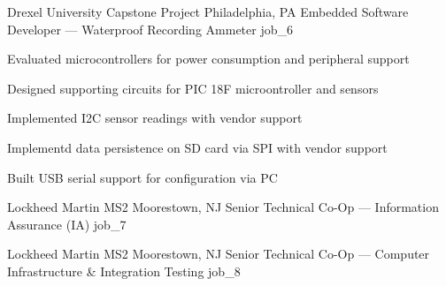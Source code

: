 \documentclass[10pt]{barag_resume}
\begin{document}
    \begin{job}{Drexel University Capstone Project}
        {Philadelphia, PA}
        {Embedded Software Developer --- Waterproof Recording Ammeter}
        {job_6}
            \begin{itemize*}
                \item Evaluated microcontrollers for power consumption and peripheral support
                \item Designed supporting circuits for PIC 18F microontroller and sensors
                \item Implemented I2C sensor readings with vendor support
                \item Implementd data persistence on SD card via SPI  with vendor support
                \item Built USB serial support for configuration via PC
            \end{itemize*}
    \end{job}

    \begin{job}{Lockheed Martin MS2}
        {Moorestown, NJ}
        {Senior Technical Co-Op --- Information Assurance (IA)}
        {job_7}
    \end{job}

    \begin{job}{Lockheed Martin MS2}
        {Moorestown, NJ}
        {Senior Technical Co-Op --- Computer Infrastructure \& Integration Testing}
        {job_8}
    \end{job}
\end{document}
